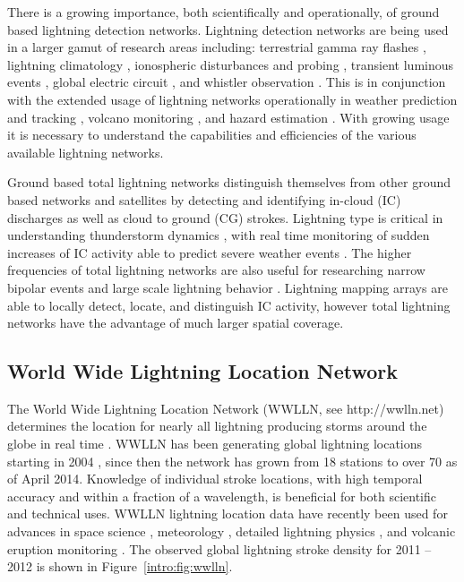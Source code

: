 There is a growing importance, both scientifically and operationally, of ground based lightning detection networks.
Lightning detection networks are being used in a larger gamut of research areas including: terrestrial gamma ray flashes \citep{Dwyer2012, Gjesteland2011, Connaughton2010}, lightning climatology \citep{Virts2013, Virts2011a, Burgesser2012}, ionospheric disturbances and probing \citep{Jacobson2010, Singh2011}, transient luminous events \citep{Soula2011}, global electric circuit  \citep{Holzworth2005}, and whistler observation \citep{Collier2010, Collier2011a, Burkholder2013}.
This is in conjunction with the extended usage of lightning networks operationally in weather prediction and tracking \citep{Fierro2012, Pan2010, Thomas2010d}, volcano monitoring \citep{Doughton2010}, and hazard estimation \citep{Altaratz2010}.
With growing usage it is necessary to understand the capabilities and efficiencies of the various available lightning networks.

Ground based total lightning networks distinguish themselves from other ground based networks and satellites by detecting and identifying in-cloud (IC) discharges as well as cloud to ground (CG) strokes.
Lightning type is critical in understanding thunderstorm dynamics \citep{Williams1989}, with real time monitoring of sudden increases of IC activity able to predict severe weather events \citep{Rudlosky2013, Darden2010, Metzger2013, Schultz2009, Schultz2011}.
The higher frequencies of total lightning networks are also useful for researching narrow bipolar events \citep{Suszcynsky2003} and large scale lightning behavior \citep{Hutchins2013}.
Lightning mapping arrays are able to locally detect, locate, and distinguish IC activity, however total lightning networks have the advantage of much larger spatial coverage.

\subsection{World Wide Lightning Location Network}

The World Wide Lightning Location Network (WWLLN, see http://wwlln.net) determines the location for nearly all lightning producing storms around the globe in real time \citep{Jacobson2006c}.
WWLLN has been generating global lightning locations starting in 2004 \citep{Rodger2006, Rodger2009}, since then the network has grown from 18 stations to over 70 as of April 2014.
Knowledge of individual stroke locations, with high temporal accuracy and within a fraction of a wavelength, is beneficial for both scientific and technical uses.
WWLLN lightning location data have recently been used for advances in space science \citep{Lay2007, Kumar2009, Collier2009, Holzworth2011, Jacobson2011}, meteorology \citep{Price2009,Thomas2010d}, detailed lightning physics \citep{Connaughton2010}, and volcanic eruption monitoring \citep{Doughton2010}.
The observed global lightning stroke density for 2011 -- 2012 is shown in Figure~\ref{intro:fig:wwlln}.


